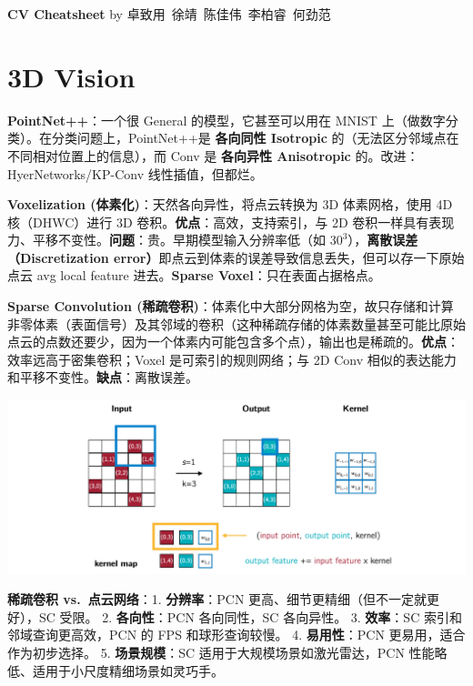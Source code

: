 \documentclass[
  8pt]{extarticle}
\author{}
\date{}
\begin{document}
\begin{multicols*}{4}
    \footnotesize

    \begin{center}
        \textbf{CV Cheatsheet} by 卓致用\ 徐靖\ 陈佳伟\ 李柏睿\ 何劲范
    \end{center}
    \vspace{-1.75em} %

\hypertarget{d-vision}{%
\section{3D Vision}\label{d-vision}}

\textbf{PointNet++}：一个很 General 的模型，它甚至可以用在 MNIST
上（做数字分类）。在分类问题上，PointNet++是 \textbf{各向同性 Isotropic}
的（无法区分邻域点在不同相对位置上的信息），而 Conv 是 \textbf{各向异性
Anisotropic} 的。改进：HyerNetworks/KP-Conv 线性插值，但都烂。

\textbf{Voxelization (体素化)}：天然各向异性，将点云转换为 3D
体素网格，使用 4D 核（DHWC）进行 3D
卷积。\textbf{优点}：高效，支持索引，与 2D
卷积一样具有表现力、平移不变性。\textbf{问题}：贵。早期模型输入分辨率低（如
\(30^3\)），\textbf{离散误差（Discretization
error）}即点云到体素的误差导致信息丢失，但可以存一下原始点云 avg local
feature 进去。\textbf{Sparse Voxel}：只在表面占据格点。

\textbf{Sparse Convolution
(稀疏卷积)}：体素化中大部分网格为空，故只存储和计算非零体素（表面信号）及其邻域的卷积（这种稀疏存储的体素数量甚至可能比原始点云的点数还要少，因为一个体素内可能包含多个点），输出也是稀疏的。\textbf{优点}：效率远高于密集卷积；Voxel
是可索引的规则网络；与 2D Conv
相似的表达能力和平移不变性。\textbf{缺点}：离散误差。

\includegraphics{./Cheatsheet-01-Sequential-Data.assets/image-20250618022954153.png}

\textbf{稀疏卷积 vs.~点云网络}：1. \textbf{分辨率}：PCN
更高、细节更精细（但不一定就更好），SC 受限。 2. \textbf{各向性}：PCN
各向同性，SC 各向异性。 3. \textbf{效率}：SC 索引和邻域查询更高效，PCN
的 FPS 和球形查询较慢。 4. \textbf{易用性}：PCN
更易用，适合作为初步选择。 5. \textbf{场景规模}：SC
适用于大规模场景如激光雷达，PCN 性能略低、适用于小尺度精细场景如灵巧手。


\end{multicols*}
\end{document}
